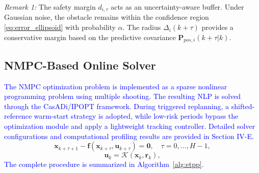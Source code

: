 \documentclass[lettersize,journal]{IEEEtran}
\newcommand{\vect}[1]{\boldsymbol{#1}}
\begin{document}
\textit{Remark 1:} The safety margin $d_{i,\tau}$ acts as an uncertainty-aware buffer. Under Gaussian noise, the obstacle remains within the confidence region \eqref{eq:error_ellipsoid} with probability $\alpha$. The radius $\Delta_i(k+\tau)$ provides a conservative margin based on the predictive covariance $\vect{P}_{pos,i}(k+\tau|k)$.

\subsection{NMPC-Based Online Solver}

\textcolor{blue}{The NMPC optimization problem is implemented as a sparse nonlinear programming problem using multiple shooting. The resulting NLP is solved through the CasADi/IPOPT framework. During triggered replanning, a shifted-reference warm-start strategy is adopted, while low-risk periods bypass the optimization module and apply a lightweight tracking controller. Detailed solver configurations and computational profiling results are provided in Section IV-E.}
\begin{equation}
	\vect{x}_{k+\tau+1} - \vect{f}(\vect{x}_{k+\tau}, \vect{u}_{k+\tau}) = \vect{0}, \quad \tau=0,\ldots,H-1,
	\label{eq:multiple_shooting}
\end{equation}
\begin{equation}
	\vect{u}_k=\mathcal{K}(\vect{x}_k,\vect{r}_k),
	\label{eq:nominal_control}
\end{equation}
\textcolor{blue}{The complete procedure is summarized in Algorithm~\ref{alg:etpp}.}
\end{document}
